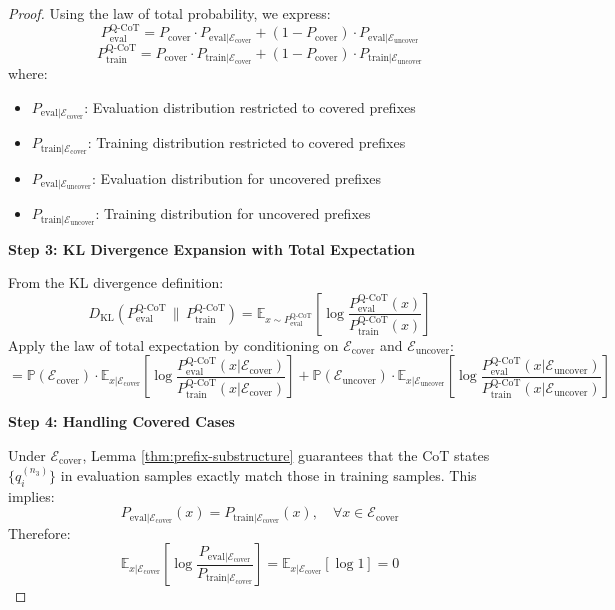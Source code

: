 \begin{proof}
Using the law of total probability, we express:
\[
P_{\text{eval}}^{\text{Q-CoT}} = P_{\text{cover}} \cdot P_{\text{eval}|\mathcal{E}_{\text{cover}}} + (1-P_{\text{cover}}) \cdot P_{\text{eval}|\mathcal{E}_{\text{uncover}}}
\]
\[
P_{\text{train}}^{\text{Q-CoT}} = P_{\text{cover}} \cdot P_{\text{train}|\mathcal{E}_{\text{cover}}} + (1-P_{\text{cover}}) \cdot P_{\text{train}|\mathcal{E}_{\text{uncover}}}
\]
where:
\begin{itemize}
    \item $P_{\text{eval}|\mathcal{E}_{\text{cover}}}$: Evaluation distribution restricted to covered prefixes
    \item $P_{\text{train}|\mathcal{E}_{\text{cover}}}$: Training distribution restricted to covered prefixes
    \item $P_{\text{eval}|\mathcal{E}_{\text{uncover}}}$: Evaluation distribution for uncovered prefixes
    \item $P_{\text{train}|\mathcal{E}_{\text{uncover}}}$: Training distribution for uncovered prefixes
\end{itemize}

\vspace{0.5em}

\noindent \textbf{Step 3: KL Divergence Expansion with Total Expectation}

From the KL divergence definition:
\[
D_{\mathrm{KL}}\left(P_{\text{eval}}^{\text{Q-CoT}} \,\big\|\, P_{\text{train}}^{\text{Q-CoT}}\right) = \mathbb{E}_{x \sim P_{\text{eval}}^{\text{Q-CoT}}} \left[ \log \frac{P_{\text{eval}}^{\text{Q-CoT}}(x)}{P_{\text{train}}^{\text{Q-CoT}}(x)} \right]
\]
Apply the law of total expectation by conditioning on $\mathcal{E}_{\text{cover}}$ and $\mathcal{E}_{\text{uncover}}$:
\[
= \mathbb{P}(\mathcal{E}_{\text{cover}}) \cdot \mathbb{E}_{x|\mathcal{E}_{\text{cover}}} \left[ \log \frac{P_{\text{eval}}^{\text{Q-CoT}}(x|\mathcal{E}_{\text{cover}})}{P_{\text{train}}^{\text{Q-CoT}}(x|\mathcal{E}_{\text{cover}})} \right] + \mathbb{P}(\mathcal{E}_{\text{uncover}}) \cdot \mathbb{E}_{x|\mathcal{E}_{\text{uncover}}} \left[ \log \frac{P_{\text{eval}}^{\text{Q-CoT}}(x|\mathcal{E}_{\text{uncover}})}{P_{\text{train}}^{\text{Q-CoT}}(x|\mathcal{E}_{\text{uncover}})} \right]
\]

\vspace{0.5em}

\noindent \textbf{Step 4: Handling Covered Cases}

Under $\mathcal{E}_{\text{cover}}$, Lemma \ref{thm:prefix-substructure} guarantees that the CoT states $\{q_i^{(n_3)}\}$ in evaluation samples exactly match those in training samples. This implies:
\[
P_{\text{eval}|\mathcal{E}_{\text{cover}}}(x) = P_{\text{train}|\mathcal{E}_{\text{cover}}}(x), \quad \forall x \in \mathcal{E}_{\text{cover}}
\]
Therefore:
\[
\mathbb{E}_{x|\mathcal{E}_{\text{cover}}} \left[ \log \frac{P_{\text{eval}|\mathcal{E}_{\text{cover}}}}{P_{\text{train}|\mathcal{E}_{\text{cover}}}} \right] = \mathbb{E}_{x|\mathcal{E}_{\text{cover}}} [\log 1] = 0
\]


\end{proof}
